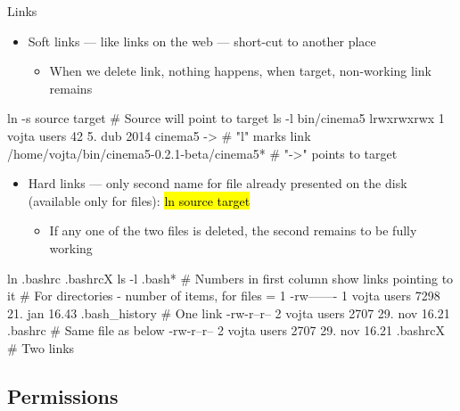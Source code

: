 \documentclass[compress, ucs, xelatex, 11pt, xcolor=svgnames, aspectratio=169,
	hyperref={
		bookmarks=true,
		unicode=true,
		colorlinks=true,
		pdftitle={Linux, command line and MetaCentrum},
		plainpages=false,
		pdfauthor={Vojtech Zeisek},
		pdfsubject={Course about use of Linux command line, writing shell scripts and using MetaCentrum of CESNET},
		pdfcreator={XeLaTeX},
		pdfkeywords={Linux, GNU, BASH, shell, command line, MetaCentrum},
		linkcolor=DarkRed, %
		anchorcolor=DarkBlue, %
		citecolor=Indigo, %
		filecolor=NavyBlue, %
		menucolor=DarkMagenta, %
		urlcolor=DarkBlue, %
		pdftex},
	url={hyphens, lowtilde} %
	]{beamer}
\renewcommand{\texttt}[1]{\hl{\ttfamily #1}}
\begin{document}
\begin{frame}[fragile]{Links}
	\label{links}
	\begin{itemize}
		\item Soft links --- like links on the web --- short-cut to another place
		\begin{itemize}
			\item When we delete link, nothing happens, when target, non-working link remains
		\end{itemize}
	\end{itemize}
	\vfill
	\begin{bashcode}
    ln -s source target # Source will point to target
    ls -l bin/cinema5
    lrwxrwxrwx 1 vojta users 42 5. dub 2014 cinema5 -> # "l" marks link
      /home/vojta/bin/cinema5-0.2.1-beta/cinema5* # "->" points to target
	\end{bashcode}
	\vfill
	\begin{itemize}
		\item Hard links --- only second name for file already presented on the disk (available only for files): \texttt{ln source target}
		\begin{itemize}
			\item If any one of the two files is deleted, the second remains to be fully working
		\end{itemize}
	\end{itemize}
	\vfill
	\begin{bashcode}
    ln .bashrc .bashrcX
    ls -l .bash* # Numbers in first column show links pointing to it
                 # For directories - number of items, for files = 1
    -rw------- 1 vojta users 7298 21. jan 16.43 .bash_history # One link
    -rw-r--r-- 2 vojta users 2707 29. nov 16.21 .bashrc # Same file as below
    -rw-r--r-- 2 vojta users 2707 29. nov 16.21 .bashrcX # Two links
	\end{bashcode}
\end{frame}

\subsection{Permissions}
\end{document}

